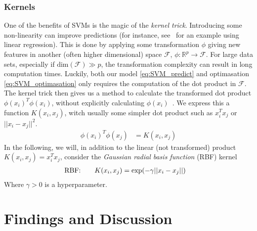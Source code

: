                 \subsubsection{Kernels}
                    One of the benefits of SVMs is the magic of the \textit{kernel trick}. Introducing some non-linearity can improve predictions (for instance, see~\citep{Project1} for an example using linear regression). This is done by applying some transformation $\phi$ giving new features in another (often higher dimensional) space $\mathcal{F}$, $\phi: \mathbb{R}^p \xrightarrow{} \mathcal{F}$. For large data sets, especially if $\text{dim}(\mathcal{F}) \gg p$, the transformation complexity can result in long computation times. Luckily, both our model \cref{eq:SVM_predict} and optimasation \cref{eq:SVM_optimasation} only requires the computation of the dot product in $\mathcal{F}$. The kernel trick then gives us a method to calculate the transformed dot product $\phi(x_i)^T \phi(x_i)$, without explicitly calculating $\phi(x_i)$~\citep{kernelTrick}. We express this a function $K(x_i, x_j)$, witch usually some simpler dot product such as $x_i^T x_j$ or $||x_i - x_j||^2$.      
                    \begin{align*}
                        \phi(x_i)^T \phi(x_j) &= K(x_i, x_j)
                    \end{align*}
                    In the following, we will, in addition to the linear (not transformed) product $K(x_i, x_j) = x_i^T x_j$, consider the \textit{Gaussian radial basis function} (RBF) kernel
                    \begin{align}
                        \text{RBF:}\hspace{20px}& K(x_i, x_j) = \text{exp}(-\gamma ||x_i - x_j||)
                    \end{align}
                    Where $\gamma > 0$ is a hyperparameter.

    \section{Findings and Discussion}
